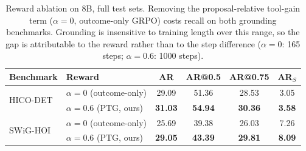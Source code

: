 
\begin{table}[t]
\centering
\small
\caption{Reward ablation on 8B, full test sets. Removing the proposal-relative
tool-gain term ($\alpha{=}0$, outcome-only GRPO) costs recall on both grounding
benchmarks. Grounding is insensitive to training length over this range, so the
gap is attributable to the reward rather than to the step difference
($\alpha{=}0$: 165 steps; $\alpha{=}0.6$: 1000 steps).}
\label{tab:reward-ablation-grounding}
\begin{tabular}{llcccc}
\toprule
Benchmark & Reward & AR & AR@0.5 & AR@0.75 & AR$_S$ \\
\midrule
\multirow{2}{*}{HICO-DET}
 & $\alpha{=}0$ (outcome-only)      & 29.09 & 51.36 & 28.53 & 3.05 \\
 & $\alpha{=}0.6$ (PTG, ours)       & \textbf{31.03} & \textbf{54.94} & \textbf{30.36} & \textbf{3.58} \\
\midrule
\multirow{2}{*}{SWiG-HOI}
 & $\alpha{=}0$ (outcome-only)      & 25.69 & 39.38 & 26.03 & 7.26 \\
 & $\alpha{=}0.6$ (PTG, ours)       & \textbf{29.05} & \textbf{43.39} & \textbf{29.81} & \textbf{8.09} \\
\bottomrule
\end{tabular}
\end{table}

